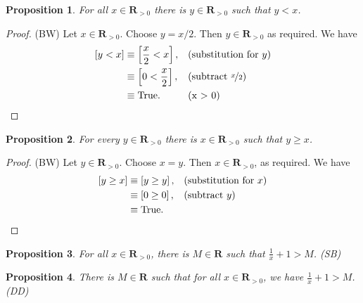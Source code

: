 \documentclass[12pt,fleqn,answers]{exam}
\newcommand{\reals}{\mathbf{R}}
\newcommand{\true}{\mathrm{True}}
\newenvironment{myproof}
  {\begin{shaded}\begin{proof}}
  {\end{proof}\end{shaded}}
\newtheorem{prop}{Proposition}
\begin{document}
    \begin{prop}   For all $x \in \reals_{>0}$ there is 
      $y \in \reals_{> 0}$ such that $y < x$. 
    \end{prop}
     
    
      
      \begin{myproof} (BW) Let $x \in \reals_{>0}$. Choose $y = x/2$. Then $y \in \reals_{>0}$ as required. We have
         \begin{align*}
         \left[y < x \right] &\equiv \left[\frac{x}{2} < x \right], &&\text{(substitution for $y$)} \\
                                   &\equiv \left[0 < \frac{x}{2}  \right], &&\text{(subtract $\nicefrac{x}{2}$)} \\
                                   &\equiv \true.  &&\text{(x > 0)} \qedhere
      \end{align*}
      \end{myproof}

       

       \begin{prop} For every $y \in \reals_{> 0}$ there is  
        $x \in \reals_{>0}$ such that $y \geq  x$.
      \end{prop}

       \begin{myproof} (BW) Let $y \in \reals_{>0}$. Choose $x = y$. Then $x \in \reals_{>0}$, as 
        required. We have
       \begin{align*}
         \left[y \geq x  \right] &\equiv \left[y \geq  y \right], && \text{(substitution for $x$)} \\
                                      &\equiv \left[0 \geq 0 \right], &&\text{(subtract $y$)} \\
                                      &\equiv \true. && \qedhere
       \end{align*}
       
       \end{myproof}

   


       
    \begin{prop} For all $x \in \reals_{>0}$, there is $M \in \reals$ such
     that $\frac{1}{x} +1 > M$. \hfill (SB)
    \end{prop}

    \begin{prop}
      There is $M \in \reals$ such that for all $x \in \reals_{>0}$,
     we have $\frac{1}{x} + 1 > M$. \hfill (DD) 
    \end{prop}
\end{document}
